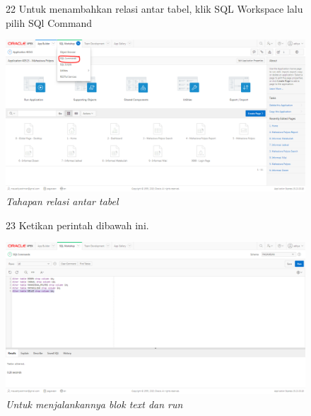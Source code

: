\begin{enumerate}
\begin{figure}[!htbp]
\item[22]Untuk menambahkan relasi antar tabel, klik SQL Workspace lalu pilih SQl Command
	\begin{center}
	\includegraphics[scale=0.2]{figures/tahap25.png}
	\caption{\textit{Tahapan relasi antar tabel}}
	\end{center}	 
\end{figure}

\begin{figure}[!htbp]
\item[23]Ketikan perintah dibawah ini.
	\begin{center}
	\includegraphics[scale=0.2]{figures/tahap26a.png}
	\caption{\textit{Untuk menjalankannya blok text dan run}}
	\end{center}	 
\end{figure}


\end{enumerate}
